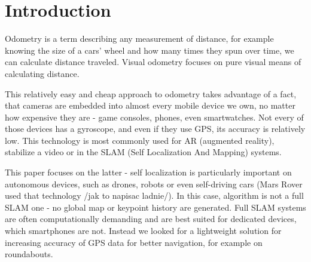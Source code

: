 
\chapter*{Introduction}


Odometry is a term describing any measurement of distance, for example knowing the size of a cars' wheel and how many times they spun over time, we can calculate distance traveled. Visual odometry focuses on pure visual means of calculating distance.


This relatively easy and cheap approach to odometry takes advantage of a fact, that cameras are embedded into almost every mobile device we own, no matter how expensive they are - game consoles, phones, even smartwatches. Not every of those devices has a gyroscope, and even if they use GPS, its accuracy is relatively low. This technology is most commonly used for AR (augmented reality), stabilize a video or in the SLAM (Self Localization And Mapping) systems.

This paper focuses on the latter - self localization is particularly important on autonomous devices, such as drones, robots or even self-driving cars (Mars Rover used that technology /jak to napisac ladnie/). In this case, algorithm is not a full SLAM one - no global map or keypoint history are generated.
Full SLAM systems are often computationally demanding and are best suited for dedicated devices, which smartphones are not. Instead we looked for a lightweight solution for increasing accuracy of GPS data for better navigation, for example on roundabouts.

